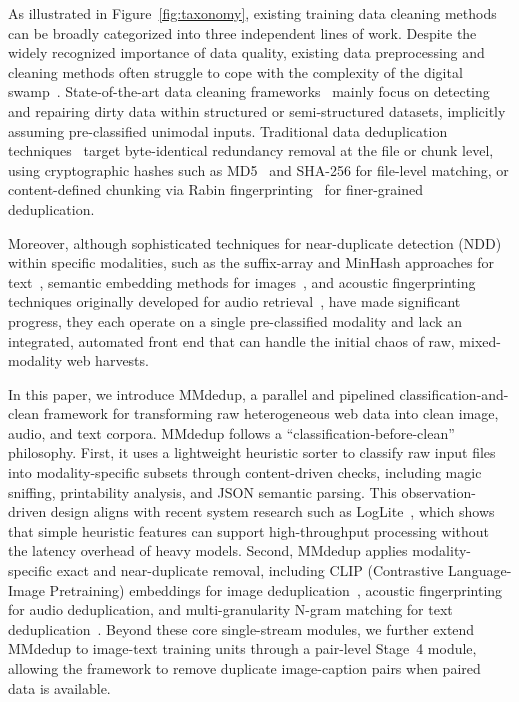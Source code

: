 \documentclass[conference]{IEEEtran}
\begin{document}
As illustrated in Figure~\ref{fig:taxonomy}, existing training data cleaning methods can be broadly categorized into three independent lines of work. Despite the widely recognized importance of data quality, existing data preprocessing and cleaning methods often struggle to cope with the complexity of the digital swamp~\cite{chu2016data}. State-of-the-art data cleaning frameworks~\cite{dallachiesa2013nadeef, rekatsinas2017, mahdavi2019raha, Song2021, Naeem2024, ding2025} mainly focus on detecting and repairing dirty data within structured or semi-structured datasets, implicitly assuming pre-classified unimodal inputs. 
Traditional data deduplication techniques~\cite{Xia2016, Fu2025} target byte-identical redundancy removal at the file or chunk level, using cryptographic hashes such as MD5~\cite{rivest1992md5} and SHA-256 for file-level matching, or content-defined chunking via Rabin fingerprinting~\cite{rabin1981fingerprinting, muthitacharoen2001low} for finer-grained deduplication.

Moreover, although sophisticated techniques for near-duplicate detection (NDD) within specific modalities, such as the suffix-array and MinHash approaches for text~\cite{lee2022deduplicating}, semantic embedding methods for images~\cite{abbas2023semdedup}, and acoustic fingerprinting techniques originally developed for audio retrieval~\cite{wang2003industrial}, have made significant progress, they each operate on a single pre-classified modality and lack an integrated, automated front end that can handle the initial chaos of raw, mixed-modality web harvests.

In this paper, we introduce MMdedup, a parallel and pipelined classification-and-clean framework for transforming raw heterogeneous web data into clean image, audio, and text corpora. MMdedup follows a ``classification-before-clean'' philosophy. First, it uses a lightweight heuristic sorter to classify raw input files into modality-specific subsets through content-driven checks, including magic sniffing, printability analysis, and JSON semantic parsing. This observation-driven design aligns with recent system research such as LogLite~\cite{tang2025loglite}, which shows that simple heuristic features can support high-throughput processing without the latency overhead of heavy models. Second, MMdedup applies modality-specific exact and near-duplicate removal, including CLIP (Contrastive Language-Image Pretraining) embeddings for image deduplication~\cite{radford2021learning}, acoustic fingerprinting for audio deduplication, and multi-granularity N-gram matching for text deduplication~\cite{broder1997resemblance}. Beyond these core single-stream modules, we further extend MMdedup to image-text training units through a pair-level Stage~4 module, allowing the framework to remove duplicate image-caption pairs when paired data is available.
\end{document}
